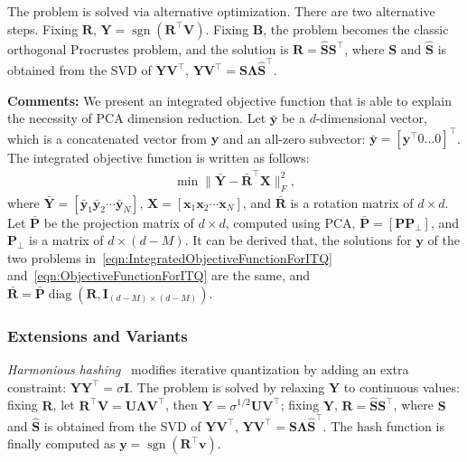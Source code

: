 \documentclass[10pt,journal,compsoc]{IEEEtran}
\begin{document}
The problem is solved via alternative optimization.
There are two alternative steps.
Fixing $\mathbf{R}$,
$\mathbf{Y} = \operatorname{sgn}(\mathbf{R}^\top\mathbf{V})$.
Fixing $\mathbf{B}$,
the problem becomes the classic orthogonal Procrustes problem,
and the solution is $\mathbf{R} = \hat{\mathbf{S}} \mathbf{S}^\top$,
where $\mathbf{S}$ and $\hat{\mathbf{S}}$
is obtained
from the SVD of $\mathbf{Y}\mathbf{V}^\top$,
$\mathbf{Y}\mathbf{V}^\top = \mathbf{S}\boldsymbol{\Lambda}\hat{\mathbf{S}}^\top$.

\textbf{Comments:}
We present an integrated objective function
that is able to explain
the necessity of PCA dimension reduction.
Let $\bar{\mathbf{y}}$ be a $d$-dimensional vector,
which is a concatenated vector from $\mathbf{y}$ and an all-zero subvector:
$\bar{\mathbf{y}} = [\mathbf{y}^\top 0... 0]^\top$.
The integrated objective function is written as follows:
\begin{align}
\min\|\bar{\mathbf{Y}} - \bar{\mathbf{R}}^\top\mathbf{X}\|_F^2,\label{eqn:IntegratedObjectiveFunctionForITQ}
\end{align}
where $\bar{\mathbf{Y}} = [\bar{\mathbf{y}}_1 \bar{\mathbf{y}}_2 \cdots \bar{\mathbf{y}}_N]$,
$\mathbf{X} = [\mathbf{x}_1 \mathbf{x}_2 \cdots \mathbf{x}_N]$,
and $\bar{\mathbf{R}}$ is a rotation matrix of $d \times d$.
Let $\bar{\mathbf{P}}$ be the projection matrix of $d \times d$,
computed using PCA,
$\bar{\mathbf{P}} = [\mathbf{P} \mathbf{P}_{\perp}]$,
and $\mathbf{P}_{\perp}$ is a matrix of $d \times (d-M)$.
It can be derived that,
the solutions for $\mathbf{y}$ of the two problems
in~\ref{eqn:IntegratedObjectiveFunctionForITQ} and~\ref{eqn:ObjectiveFunctionForITQ}
are the same,
and $\bar{\mathbf{R}} = \bar{\mathbf{P}}\operatorname{diag}(\mathbf{R}, \mathbf{I}_{(d-M) \times (d-M)})$.



\subsubsection{Extensions and Variants}
\emph{Harmonious hashing}~\cite{XuBLCHC13}
modifies iterative quantization
by adding an extra constraint:
$\mathbf{Y}\mathbf{Y}^\top=\sigma \mathbf{I}$.
The problem is solved
by relaxing $\mathbf{Y}$ to continuous values:
fixing $\mathbf{R}$,
let $\mathbf{R}^\top\mathbf{V} = \mathbf{\mathbf{U} \boldsymbol{\Lambda}\mathbf{V}^\top}$,
then $\mathbf{Y} = \sigma^{1/2} \mathbf{U} \mathbf{V}^\top$;
fixing $\mathbf{\mathbf{Y}}$,
$\mathbf{R} = \hat{\mathbf{S}} \mathbf{S}^\top$,
where $\mathbf{S}$ and $\hat{\mathbf{S}}$
is obtained
from the SVD of $\mathbf{Y}\mathbf{V}^\top$,
$\mathbf{Y}\mathbf{V}^\top = \mathbf{S}\boldsymbol{\Lambda}\hat{\mathbf{S}}^\top$.
The hash function is finally computed
as $\mathbf{y} = \operatorname{sgn}(\mathbf{R}^\top\mathbf{v})$.
\end{document}
